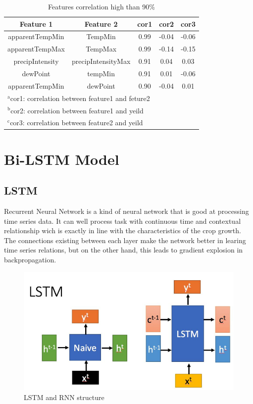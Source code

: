 \documentclass[conference]{IEEEtran}
\begin{document}
\begin{table}[htbp]
\caption{Features correlation high than 90\%}
\begin{center}
\begin{tabular}{|c|c|c|c|c|}
\hline
Feature 1 & Feature 2 & cor1 & cor2 & cor3\\
\hline
apparentTempMin & TempMin     & 0.99 & -0.04 & -0.06 \\
apparentTempMax & TempMax     & 0.99 & -0.14 & -0.15 \\
precipIntensity & precipIntensityMax & 0.91 & 0.04  & 0.03  \\
dewPoint & tempMin & 0.91 & 0.01  & -0.06 \\
apparentTempMin & dewPoint & 0.90 & -0.04 & 0.01 \\
\hline
\multicolumn{5}{l}{$^{\mathrm{a}}$cor1: correlation between feature1 and feture2} \\
\multicolumn{5}{l}{$^{\mathrm{b}}$cor2: correlation between feature1 and yeild} \\ 
\multicolumn{5}{l}{$^{\mathrm{c}}$cor3: correlation between feature2 and yeild} \\
\end{tabular}
\label{tab:correlation}
\end{center}
\end{table}

\section{Bi-LSTM Model}
\subsection{LSTM}
Recurrent Neural Network is a kind of neural network that is good at processing time series data. It can well process task with continuous time and contextual relationship wich is exactly in line with the characteristics of the crop growth. The connections existing between each layer make the network better in learing time series relations, but on the other hand, this leads to gradient explosion in backpropagation. \cite{hochreiter1997long}

\begin{figure}[htbp]
  \centerline{\includegraphics[width=0.7\linewidth]{figures/LSTM_struc.png}}
  \caption{LSTM and RNN structure}
  \label{fig:LSTM}
\end{figure}
\end{document}

